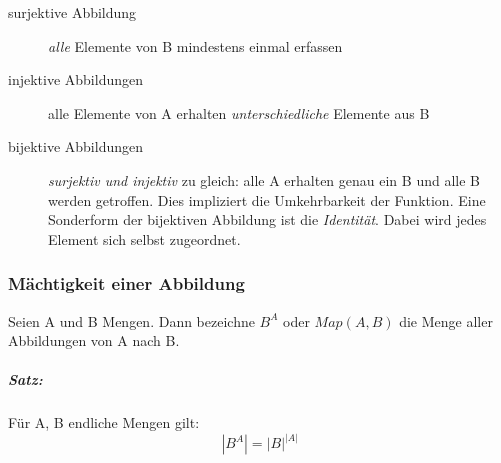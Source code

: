 \documentclass[a4paper,12pt, DIV12]{scrartcl}
\begin{document}
\begin{description}
\item[surjektive Abbildung] \emph{alle} Elemente von B mindestens einmal erfassen
\item[injektive Abbildungen] alle Elemente von A erhalten \emph{unterschiedliche} Elemente aus B
\item[bijektive Abbildungen] \emph{surjektiv und injektiv} zu gleich: alle A erhalten genau ein B und alle B werden getroffen.
Dies impliziert die Umkehrbarkeit der Funktion. Eine Sonderform der bijektiven Abbildung ist die \emph{Identität}. Dabei wird jedes Element sich selbst zugeordnet.
\end{description}

\begin{figure}
\hfill
{}\hfill
{}
\end{figure}

\subsubsection{Mächtigkeit einer Abbildung}
Seien A und B Mengen.
Dann bezeichne $B^A$ oder $Map(A,B)$ die Menge aller Abbildungen von A nach B.
\subparagraph*{Satz:}
Für A, B endliche Mengen gilt:
$$ |B^A| = {|B|}^{|A|} $$
\end{document}
